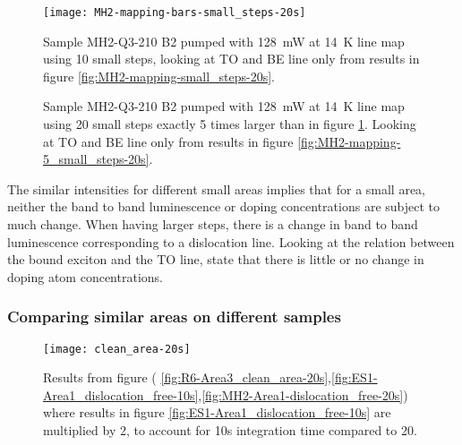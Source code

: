 
\begin{figure}[H]
\centering
\texttt{[image: MH2-mapping-bars-small\_steps-20s]}
\caption[MH2-Q3-210 line mapping]{Sample MH2-Q3-210 B2 pumped with 128~mW at 14~K line map using 10 small steps, looking at TO and BE line only from results in figure \ref{fig:MH2-mapping-small_steps-20s}.}
\label{fig:MH2-mapping-bars-small_steps-20s}%
\end{figure}



\begin{figure}[H]
\centering
{}
\label{fig:MH2-5stepmapping}
\caption[MH2-Q3-210 line mapping]{Sample MH2-Q3-210 B2 pumped with 128~mW at 14~K line map using 20 small steps exactly 5 times larger than in figure \ref{fig:MH2-mapping-bars-small_steps-20s}. Looking at TO and BE line only from results in figure \ref{fig:MH2-mapping-5_small_steps-20s}.}
\end{figure}


The similar intensities for different small areas implies that for a small area, neither the band to band luminescence or doping concentrations are subject to much change. When having larger steps, there is a change in band to band luminescence corresponding to a dislocation line. Looking at the relation between the bound exciton and the TO line, \cite{tajima78} state that there is little or no change in doping atom concentrations.



\subsubsection{Comparing similar areas on different samples}


\begin{figure}[H]
\centering
\texttt{[image: clean\_area-20s]}
\caption[Comparisons in a clean area]{Results from figure ( \ref{fig:R6-Area3_clean_area-20s},\ref{fig:ES1-Area1_dislocation_free-10s},\ref{fig:MH2-Area1-dislocation_free-20s}) where results in figure \ref{fig:ES1-Area1_dislocation_free-10s} are multiplied by 2, to account for 10s integration time compared to 20.}
\label{fig:clean_area-20s_comparison}%
\end{figure}

